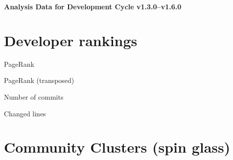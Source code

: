 \documentclass{article}
\begin{document}
\setlength{\parindent}{0pt}
\begin{center}
\begin{Large}
\textbf{Analysis Data for Development Cycle v1.3.0--v1.6.0}
\end{Large}
\end{center}
\section{Developer rankings}
\begin{small}\renewcommand{\tabcolsep}{1pt}
\begin{minipage}{0.5\linewidth}
PageRank\\

\end{minipage}%
\begin{minipage}{0.5\linewidth}
PageRank (transposed)\\

\end{minipage}

\renewcommand{\tabcolsep}{5pt}
\begin{minipage}{0.5\linewidth}
Number of commits\\

\end{minipage}%
\begin{minipage}{0.5\linewidth}
Changed lines\\

\end{minipage}
\end{small}
\newpage\section{Community Clusters (spin glass)}
\end{document}
